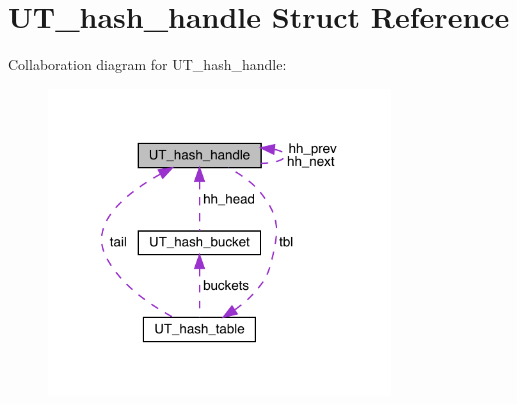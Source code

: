 \hypertarget{struct_u_t__hash__handle}{}\section{U\+T\+\_\+hash\+\_\+handle Struct Reference}
\label{struct_u_t__hash__handle}


Collaboration diagram for U\+T\+\_\+hash\+\_\+handle\+:\nopagebreak
\begin{figure}[H]
\begin{center}
\leavevmode
\includegraphics[width=257pt]{struct_u_t__hash__handle__coll__graph}
\end{center}
\end{figure}

